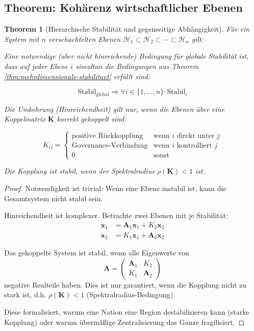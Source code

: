 \documentclass[a4paper, 12pt, twoside, openright]{report}
\newtheorem{theorem}{Theorem}[section]
\theoremstyle{definition}
\theoremstyle{definition}
\begin{document}
\subsection{Theorem: Kohärenz wirtschaftlicher Ebenen}

\begin{theorem}[Hierarchische Stabilität und gegenseitige Abhängigkeit]
\label{thm:hierarchische-stabilitaet}
Für ein System mit $n$ verschachtelten Ebenen $\mathcal{H}_1 \subset \mathcal{H}_2 \subset \cdots \subset \mathcal{H}_n$ gilt:

Eine notwendige (aber nicht hinreichende) Bedingung für globale Stabilität ist, dass auf \emph{jeder} Ebene $i$ simultan die Bedingungen aus Theorem \ref{thm:mehrdimensionale-stabilitaet} erfüllt sind:

\begin{equation}
\text{Stabil}_{\text{global}} \Rightarrow \forall i \in \{1,\ldots,n\}: \text{Stabil}_i
\end{equation}

Die Umkehrung (Hinreichendheit) gilt nur, wenn die Ebenen über eine Koppelmatrix $\mathbf{K}$ korrekt gekoppelt sind:

\begin{equation}
K_{ij} = \begin{cases}
\text{positive Rückkopplung} & \text{wenn } i \text{ direkt unter } j \\
\text{Governance-Verbindung} & \text{wenn } i \text{ kontrolliert } j \\
0 & \text{sonst}
\end{cases}
\end{equation}

Die Kopplung ist stabil, wenn der Spektralradius $\rho(\mathbf{K}) < 1$ ist.
\end{theorem}

\begin{proof}
Notwendigkeit ist trivial: Wenn eine Ebene instabil ist, kann die Gesamtsystem nicht stabil sein.

Hinreichendheit ist komplexer. Betrachte zwei Ebenen mit je Stabilität:
\begin{align}
\dot{\mathbf{x}}_1 &= \mathbf{A}_1 \mathbf{x}_1 + K_2 \mathbf{x}_2 \\
\dot{\mathbf{x}}_2 &= K_1 \mathbf{x}_1 + \mathbf{A}_2 \mathbf{x}_2
\end{align}

Das gekoppelte System ist stabil, wenn alle Eigenwerte von
\begin{equation}
\mathbf{A} = \begin{pmatrix}
\mathbf{A}_1 & K_2 \\
K_1 & \mathbf{A}_2
\end{pmatrix}
\end{equation}
negative Realteile haben. Dies ist nur garantiert, wenn die Kopplung nicht zu stark ist, d.h. $\rho(\mathbf{K}) < 1$ (Spektralradius-Bedingung).

Diese formalisiert, warum eine Nation eine Region destabilisieren kann (starke Kopplung) oder warum übermäßige Zentralisierung das Ganze fragilisiert.
\end{proof}
\end{document}
